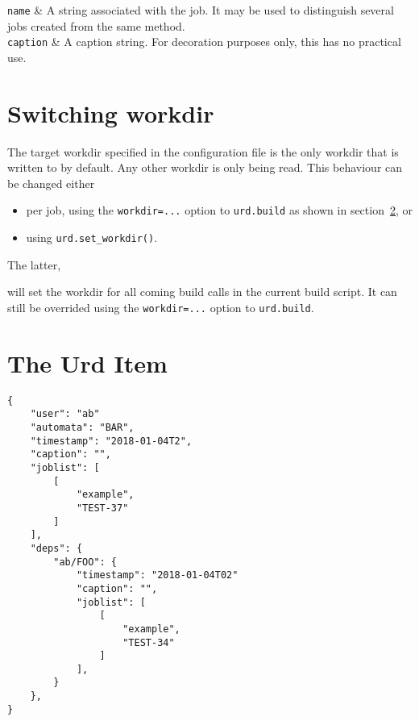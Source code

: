 \RPtwo \texttt{name} & A string associated with the job.  It may be used
    to distinguish several jobs created from the same method.\\[2ex]
    \texttt{caption} & A caption string.  For decoration purposes
    only, this has no practical use.
\stoptabletwo


\section{Switching workdir}
The target workdir specified in the configuration file is the only
workdir that is written to by default.  Any other workdir is only
being read.  This behaviour can be changed either
\begin{itemize}
\item[] per job, using the \texttt{workdir=...} option to \texttt{urd.build} as shown in section~\ref{}, or
\item[] using \texttt{urd.set\_workdir()}.
\end{itemize}
The latter,
\begin{python}
def main(urd):
    urd.set_workdir(<workdir>)}
\end{python}
will set the workdir for all coming build calls in the current build script.  It can
still be overrided using the \texttt{workdir=...} option
to \texttt{urd.build}.




\section{The Urd Item}

\begin{leftbar}
\begin{verbatim}
{
    "user": "ab"
    "automata": "BAR",
    "timestamp": "2018-01-04T2",
    "caption": "",
    "joblist": [
        [
            "example",
            "TEST-37"
        ]
    ],
    "deps": {
        "ab/FOO": {
            "timestamp": "2018-01-04T02"
            "caption": "",
            "joblist": [
                [
                    "example",
                    "TEST-34"
                ]
            ],
        }
    },
}
\end{verbatim}
\end{leftbar}


